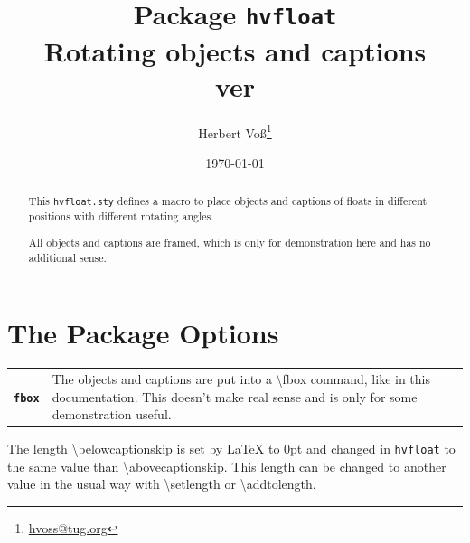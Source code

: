 \documentclass{scrartcl}
\let\hvVersion\fileversion
\newcommand\CMD[1]{{\small\ttfamily\textbackslash{}#1}}
\begin{document}
\title{Package \texttt{hvfloat}\\Rotating objects and captions\\ver \hvVersion}
\author{Herbert Voß\thanks{\protect\url{hvoss@tug.org}}}
\date{\today}
\maketitle




\begin{abstract}
This \texttt{hvfloat.sty} defines a macro to place objects and captions of floats in different positions with different rotating angles.

All objects and captions are framed, which is only for demonstration here and has no additional sense.
\end{abstract}
\vfill


\vspace*{\fill}

\clearpage


\tableofcontents

\clearpage

\listoftables
\listoffigures


\clearpage
\section{The Package Options}

\noindent\begin{tabularx}{\textwidth}{lX}
\textbf{\small\texttt{fbox}} & The objects and captions are put into a \CMD{fbox} command, like in this documentation. This doesn't make real sense and is only for some demonstration useful.
\end{tabularx}

The length \CMD{belowcaptionskip} is set by \LaTeX{} to 0pt and changed in \texttt{hvfloat} to the same value than \CMD{abovecaptionskip}. This length can be changed to another value in the usual way with \CMD{setlength} or \CMD{addtolength}.
\end{document}
